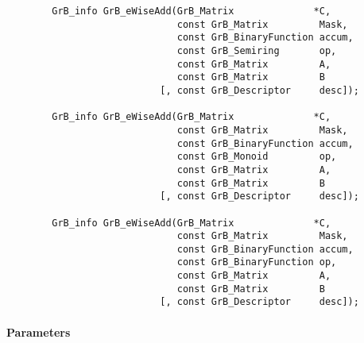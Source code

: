 \begin{verbatim}
        GrB_info GrB_eWiseAdd(GrB_Matrix              *C,
                              const GrB_Matrix         Mask,
                              const GrB_BinaryFunction accum,
                              const GrB_Semiring       op, 
                              const GrB_Matrix         A,
                              const GrB_Matrix         B
                           [, const GrB_Descriptor     desc]);
                            
        GrB_info GrB_eWiseAdd(GrB_Matrix              *C,
                              const GrB_Matrix         Mask,
                              const GrB_BinaryFunction accum,
                              const GrB_Monoid         op, 
                              const GrB_Matrix         A,
                              const GrB_Matrix         B
                           [, const GrB_Descriptor     desc]);
                            
        GrB_info GrB_eWiseAdd(GrB_Matrix              *C,
                              const GrB_Matrix         Mask,
                              const GrB_BinaryFunction accum,
                              const GrB_BinaryFunction op, 
                              const GrB_Matrix         A,
                              const GrB_Matrix         B
                           [, const GrB_Descriptor     desc]);
\end{verbatim}

\paragraph{Parameters}

